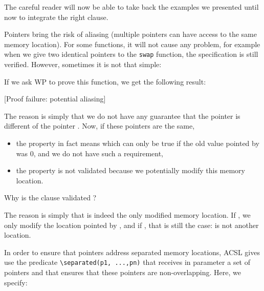 


The careful reader will now be able to take back the examples we
presented until now to integrate the right  clause.





Pointers bring the risk of aliasing (multiple pointers can have access
to the same memory location). For some functions, it will not cause any
problem, for example when we give two identical pointers to the
\texttt{swap} function, the specification is still verified. However,
sometimes it is not that simple:






If we ask WP to prove this function, we get the following result:



[Proof failure: potential aliasing]


The reason is simply that we do not have any guarantee that the pointer
 is different of the pointer . Now, if these
pointers are the same,



\begin{itemize}
\item   the property  in fact
  means  which can only
  be true if the old value pointed by  was $0$, and we do
  not have such a requirement,
\item
  the property  is not validated
  because we potentially modify this memory location.
\end{itemize}


\begin{Question}
  Why is the  clause validated ?

  The reason is simply that  is indeed the only modified memory
  location. If , we only modify the location pointed by
  , and if , \textbar{} that is still the case:
   is not another location.
\end{Question}


In order to ensure that pointers address separated memory locations,
ACSL gives use the predicate
\texttt{\textbackslash{}separated(p1,\ ...,pn)} that receives in
parameter a set of pointers and that ensures that these pointers are
non-overlapping. Here, we specify:




